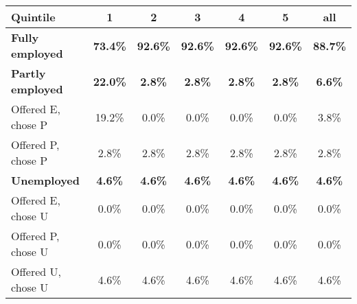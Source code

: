 \begin{center}
\begin{adjustbox}{width=\textwidth}
\begin{tabular}{lcccccc}\toprule
Quintile & 1 & 2 & 3 & 4 & 5 & all \\
\midrule
\textbf{Fully employed} & \textbf{73.4\%} & \textbf{92.6\%} & \textbf{92.6\%} & \textbf{92.6\%} & \textbf{92.6\%} & \textbf{88.7\%} \\
\textbf{Partly employed} & \textbf{22.0\%} & \textbf{2.8\%} & \textbf{2.8\%} & \textbf{2.8\%} & \textbf{2.8\%} & \textbf{6.6\%} \\
\;\;Offered E, chose P & 19.2\% & 0.0\% & 0.0\% & 0.0\% & 0.0\% & 3.8\% \\
\;\;Offered P, chose P & 2.8\% & 2.8\% & 2.8\% & 2.8\% & 2.8\% & 2.8\% \\
\textbf{Unemployed} & \textbf{4.6\%} & \textbf{4.6\%} & \textbf{4.6\%} & \textbf{4.6\%} & \textbf{4.6\%} & \textbf{4.6\%} \\
\;\;Offered E, chose U & 0.0\% & 0.0\% & 0.0\% & 0.0\% & 0.0\% & 0.0\% \\
\;\;Offered P, chose U & 0.0\% & 0.0\% & 0.0\% & 0.0\% & 0.0\% & 0.0\% \\
\;\;Offered U, chose U & 4.6\% & 4.6\% & 4.6\% & 4.6\% & 4.6\% & 4.6\% \\
\bottomrule\end{tabular}
\end{adjustbox}
\end{center}